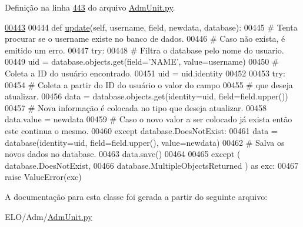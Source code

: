 Definição na linha \hyperlink{AdmUnit_8py_source_l00443}{443} do arquivo \hyperlink{AdmUnit_8py_source}{Adm\-Unit.\-py}.


\begin{DoxyCode}
\hypertarget{classAdm_1_1AdmUnit_1_1PersAdm_l00443}{}\hyperlink{classAdm_1_1AdmUnit_1_1PersAdm_a3d9372eca5d134e3c2125c40bf2147a3}{00443} 
00444     \textcolor{keyword}{def }\hyperlink{classAdm_1_1AdmUnit_1_1PersAdm_a3d9372eca5d134e3c2125c40bf2147a3}{update}(self, username, field, newdata, database): 
00445         \textcolor{comment}{# Tenta procurar se o username existe no banco de dados.
}
00446         \textcolor{comment}{# Caso não exista, é emitido um erro.
}
00447         \textcolor{keywordflow}{try}:
00448             \textcolor{comment}{# Filtra o database pelo nome do usuario.
}
00449             uid = database.objects.get(field=\textcolor{stringliteral}{'NAME'}, value=username)
00450             \textcolor{comment}{# Coleta a ID do usuário encontrado.
}
00451             uid = uid.identity
00452                 
00453             \textcolor{keywordflow}{try}:
00454                 \textcolor{comment}{# Coleta a partir do ID do usuário o valor do campo
}
00455                 \textcolor{comment}{# que deseja atualizar.
}
00456                 data = database.objects.get(identity=uid, field=field.upper())
00457                 \textcolor{comment}{# Nova informação é colocada no tipo que deseja atualizar.
}
00458                 data.value = newdata
00459             \textcolor{comment}{# Caso o novo valor a ser colocado já exista então este continua o mesmo.
}
00460             \textcolor{keywordflow}{except} database.DoesNotExist:
00461                 data = database(identity=uid, field=field.upper(), value=newdata)
00462             \textcolor{comment}{# Salva os novos dados no database.
}
00463             data.save()
00464 
00465         \textcolor{keywordflow}{except} ( database.DoesNotExist, 
00466                  database.MultipleObjectsReturned ) \textcolor{keyword}{as} exc:
00467             \textcolor{keywordflow}{raise} ValueError(exc)

\end{DoxyCode}


A documentação para esta classe foi gerada a partir do seguinte arquivo\-:\begin{DoxyCompactItemize}
\item 
E\-L\-O/\-Adm/\hyperlink{AdmUnit_8py}{Adm\-Unit.\-py}\end{DoxyCompactItemize}

